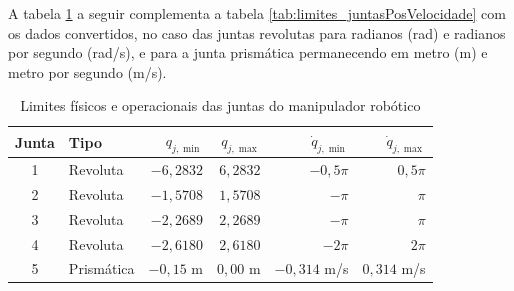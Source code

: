 A tabela \ref{tab:limites_juntasPosVelocidade_rad} a seguir complementa a tabela \eqref{tab:limites_juntasPosVelocidade} com os dados convertidos, no caso das juntas revolutas para radianos (rad) e radianos por segundo (rad/s), e para a junta prismática permanecendo em metro (m) e metro por segundo (m/s).

\begin{table}[ht]
\centering
{
\setlength{\tabcolsep}{12pt}
\renewcommand{\arraystretch}{1}
\caption{Limites físicos e operacionais das juntas do manipulador robótico}
\label{tab:limites_juntasPosVelocidade_rad}
\begin{tabular}{clrrrr}
\toprule
\textbf{Junta} & \textbf{Tipo} & $q_{j,\min}$ & $q_{j,\max}$ & $\dot{q}_{j,\min}$ & $\dot{q}_{j,\max}$ \\
\midrule
1 & Revoluta   & $-6{,}2832$ & $6{,}2832$ &
$-0{,}5\pi$ & $0{,}5\pi$ \\[4pt]
2 & Revoluta   & $-1{,}5708$ & $1{,}5708$ &
$-\pi$ & $\pi$ \\[4pt]
3 & Revoluta   & $-2{,}2689$ & $2{,}2689$
& $-\pi$ & $\pi$ \\[4pt]
4 & Revoluta   & $-2{,}6180$ & $2{,}6180$ &
$-2\pi$ & $2\pi$ \\[4pt]
5 & Prismática & $-0{,}15$ m & $0{,}00$ m &
$-0{,}314$ m/s & $0{,}314$ m/s \\[4pt]
\bottomrule
\end{tabular}
}
\end{table}
